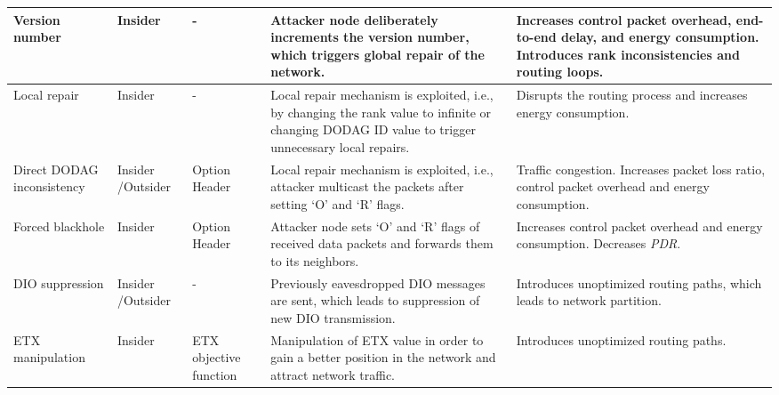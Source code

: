 \documentclass[10pt,journal,sort & compress]{IEEEtran}
\begin{document}
\begin{table*}
\begin{supertabular}[l]{|p{1.6cm}|p{1.3cm}|p{1.5cm}|p{5.8cm}|p{5.8cm}|}
		Version number                & Insider          & -                            & Attacker node deliberately increments the version number, which triggers global repair of the network.                                                                                     & Increases control packet overhead, end-to-end delay, and energy consumption. Introduces rank inconsistencies and routing loops.                                                                                                    \\ \hline
		Local repair                  & Insider          & -                            & Local repair mechanism is exploited, i.e., by changing the rank value to infinite or changing DODAG ID value to trigger unnecessary local repairs.                                                    & Disrupts the routing process and increases energy consumption.                                                                                                                                                              \\ \hline
		Direct DODAG inconsistency    & Insider
		/Outsider & Option  Header               & Local repair mechanism is exploited, i.e., attacker multicast the packets after setting `O' and `R' flags.          & Traffic congestion. Increases packet loss ratio, control packet overhead and energy consumption.                                                                                                                          \\ \hline
		Forced blackhole              & Insider          & Option  Header               & Attacker node sets `O' and `R' flags of received data packets and forwards them to its neighbors.                   & Increases control packet overhead and energy consumption. Decreases \textit{PDR}.                                                                                                                        \\ \hline
		DIO suppression               & Insider
		/Outsider & -                            & Previously eavesdropped DIO messages are sent, which leads to suppression of new DIO transmission.                                                                                       & Introduces unoptimized routing paths, which leads to network partition.                                                                                                                                                  \\ \hline
		ETX manipulation              & Insider          & ETX objective function       & Manipulation of ETX value in order to gain a better position in the network and attract network traffic.                                                                                                 & Introduces unoptimized routing paths.                                                                                                                                                                                            \\ \hline

\end{supertabular}
\end{table*}
\end{document}
